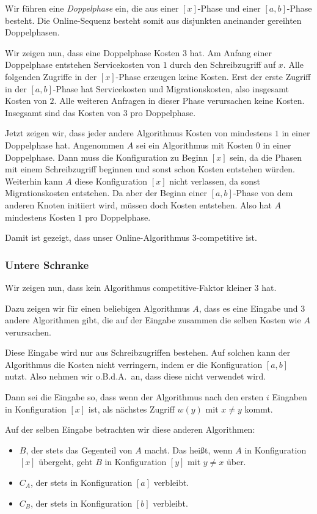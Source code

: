 \documentclass{panikzettel}
\begin{document}
Wir führen eine \emph{Doppelphase} ein, die aus einer $[x]$-Phase und einer $[a,b]$-Phase besteht. Die Online-Sequenz besteht somit aus disjunkten aneinander gereihten Doppelphasen.

Wir zeigen nun, dass eine Doppelphase Kosten $3$ hat. Am Anfang einer Doppelphase entstehen Servicekosten von $1$ durch den Schreibzugriff auf $x$. Alle folgenden Zugriffe in der $[x]$-Phase erzeugen keine Kosten. Erst der erste Zugriff in der $[a,b]$-Phase hat Servicekosten und Migrationskosten, also insgesamt Kosten von $2$. Alle weiteren Anfragen in dieser Phase verursachen keine Kosten. Insegsamt sind das Kosten von $3$ pro Doppelphase.

Jetzt zeigen wir, dass jeder andere Algorithmus Kosten von mindestens $1$ in einer Doppelphase hat. Angenommen $A$ sei ein Algorithmus mit Kosten $0$ in einer Doppelphase. Dann muss die Konfiguration zu Beginn $[x]$ sein, da die Phasen mit einem Schreibzugriff beginnen und sonst schon Kosten entstehen würden. Weiterhin kann $A$ diese Konfiguration $[x]$ nicht verlassen, da sonst Migrationskosten entstehen. Da aber der Beginn einer $[a,b]$-Phase von dem anderen Knoten initiiert wird, müssen doch Kosten entstehen. Also hat $A$ mindestens Kosten $1$ pro Doppelphase.

Damit ist gezeigt, dass unser Online-Algorithmus $3$-competitive ist.

\subsubsection{Untere Schranke}

Wir zeigen nun, dass kein Algorithmus competitive-Faktor kleiner $3$ hat.

Dazu zeigen wir für einen beliebigen Algorithmus $A$, dass es eine Eingabe und $3$ andere Algorithmen gibt, die auf der Eingabe zusammen die selben Kosten wie $A$ verursachen.

Diese Eingabe wird nur aus Schreibzugriffen bestehen. Auf solchen kann der Algorithmus die Kosten nicht verringern, indem er die Konfiguration $[a,b]$ nutzt. Also nehmen wir o.B.d.A.\ an, dass diese nicht verwendet wird.

Dann sei die Eingabe so, dass wenn der Algorithmus nach den ersten $i$ Eingaben in Konfiguration $[x]$ ist, als nächstes Zugriff $w(y)$ mit $x \ne y$ kommt.

Auf der selben Eingabe betrachten wir diese anderen Algorithmen:
\begin{itemize}
    \item $B$, der stets das Gegenteil von $A$ macht. Das heißt, wenn $A$ in Konfiguration $[x]$ übergeht, geht $B$ in Konfiguration $[y]$ mit $y \ne x$ über.
    \item $C_A$, der stets in Konfiguration $[a]$ verbleibt.
    \item $C_B$, der stets in Konfiguration $[b]$ verbleibt.
\end{itemize}
\end{document}
